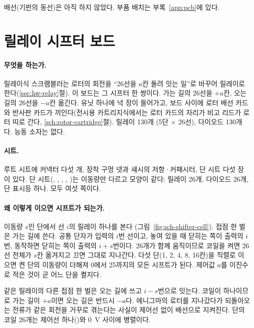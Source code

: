 배선(기판의 동선)은 아직 하지 않았다. 부품 배치는 부록~\ref{app:pcb}에 있다.

\section{릴레이 시프터 보드}\label{sch:shifter}

\paragraph{무엇을 하는가.} 릴레이식 스크램블러는 로터의 회전을 ``26선을 $a$칸 돌려 잇는 일''로 바꾸어 릴레이로
한다(\ref{sec:hw-relay}절). 이 보드는 그 시프터 한 쌍이다. 가는 길의 26선을 $+a$칸, 오는 길의 26선을 $-a$칸
옮긴다. 유닛 하나에 넉 장이 들어가고, 보드 사이에 로터 배선 카드와 반사판 카드가 끼인다(전시용 카트리지식에서는
로터 카드의 자리가 비고 리드가 로터 띠로 간다, \ref{sch:rotor-cartridge}절). 릴레이 130개
(5단 $\times$ 26선), 다이오드 130개다. 능동 소자는 없다.

\paragraph{시트.} 루트 시트에 커넥터 다섯 개, 장착 구멍 넷과 섀시의 저항·커패시터, 단 시트 다섯 장이 있다. 단
시트(, , , , )는 이동량만 다르고 모양이 같다: 릴레이 26개, 다이오드
26개, 단 표시등 하나. 모두 여섯 쪽이다.

\paragraph{왜 이렇게 이으면 시프트가 되는가.} 이동량 $s$인 단에서 선 $i$의 릴레이 하나를 본다
(그림~\ref{fig:sch-shifter-cell}). 접점 한 벌은 가는 길에 쓴다. 공통 단자가 입력의 $i$번 선이고, 놓여 있을 때 닫히는
쪽이 출력의 $i$번, 동작하면 닫히는 쪽이 출력의 $i+s$번이다. 26개가 함께 움직이므로 코일을 켜면 26선 전체가
$s$칸 옮겨지고 끄면 그대로 지나간다. 다섯 단(1, 2, 4, 8, 16칸)을 직렬로 이으면 켠 단의 이동량이 더해져 0에서
25까지의 모든 시프트가 된다. 제어값 $a$를 이진수로 적은 것이 곧 어느 단을 켤지다.

같은 릴레이의 다른 접점 한 벌은 오는 길에 쓰고 $i-s$번으로 잇는다. 코일이 하나이므로 가는 길이 $+a$이면
오는 길은 반드시 $-a$다. 에니그마의 로터를 지나갔다가 되돌아오는 전류가 같은 회전을 거꾸로 겪는다는 사실이
제어선 없이 배선으로 지켜진다. 단의 코일 26개는 제어선 하나()와 0~V 사이에 병렬이다.

